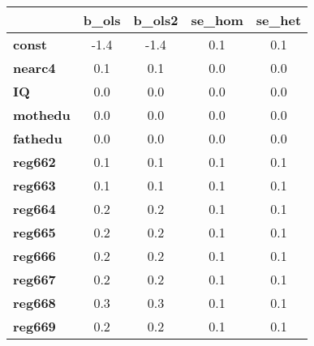 \begin{small}\begin{tabular}{|l|c|c|c|c|}
\hline
&\textbf{b_ols  }&\textbf{b_ols2 }&\textbf{se_hom }&\textbf{se_het }\\\hline
\textbf{const  }&-1.4&-1.4&0.1&0.1\\\hline
\textbf{nearc4 }&0.1&0.1&0.0&0.0\\\hline
\textbf{IQ     }&0.0&0.0&0.0&0.0\\\hline
\textbf{mothedu}&0.0&0.0&0.0&0.0\\\hline
\textbf{fathedu}&0.0&0.0&0.0&0.0\\\hline
\textbf{reg662 }&0.1&0.1&0.1&0.1\\\hline
\textbf{reg663 }&0.1&0.1&0.1&0.1\\\hline
\textbf{reg664 }&0.2&0.2&0.1&0.1\\\hline
\textbf{reg665 }&0.2&0.2&0.1&0.1\\\hline
\textbf{reg666 }&0.2&0.2&0.1&0.1\\\hline
\textbf{reg667 }&0.2&0.2&0.1&0.1\\\hline
\textbf{reg668 }&0.3&0.3&0.1&0.1\\\hline
\textbf{reg669 }&0.2&0.2&0.1&0.1\\\hline
\end{tabular}
\end{small}